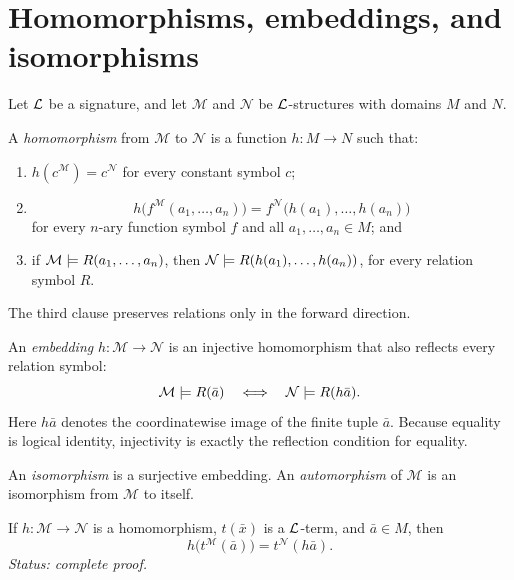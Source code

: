 \section{Homomorphisms, embeddings, and isomorphisms}
\label{sec:maps-elementarity-01}

Let \(\mathcal{L}\) be a signature, and let \(\mathcal M\) and \(\mathcal N\) be
\(\mathcal{L}\)-structures with domains \(M\) and \(N\).

\begin{definition}[Homomorphism]
A \emph{homomorphism} from \(\mathcal M\) to \(\mathcal N\) is a function
\(h:M\to N\) such that:
\begin{enumerate}
  \item \(h(c^{\mathcal M})=c^{\mathcal N}\) for every constant symbol \(c\);
  \item
  \[
    h\bigl(f^{\mathcal M}(a_1,\ldots,a_n)\bigr)
    =f^{\mathcal N}\bigl(h(a_1),\ldots,h(a_n)\bigr)
  \]
  for every \(n\)-ary function symbol \(f\) and all
  \(a_1,\ldots,a_n\in M\); and
  \item if
  \(\mathcal M\models R(a_1,\ldots,a_n)\), then
  \(\mathcal N\models R(h(a_1),\ldots,h(a_n))\), for every relation symbol
  \(R\).
\end{enumerate}
The third clause preserves relations only in the forward direction.
\end{definition}

\begin{definition}[Embedding]
An \emph{embedding} \(h:\mathcal M\to\mathcal N\) is an injective
homomorphism that also reflects every relation symbol:
\[
  \mathcal M\models R(\bar a)
  \quad\Longleftrightarrow\quad
  \mathcal N\models R(h\bar a).
\]
Here \(h\bar a\) denotes the coordinatewise image of the finite tuple
\(\bar a\).  Because equality is logical identity, injectivity is exactly the
reflection condition for equality.
\end{definition}

\begin{definition}
An \emph{isomorphism} is a surjective embedding.  An \emph{automorphism} of
\(\mathcal M\) is an isomorphism from \(\mathcal M\) to itself.
\end{definition}

\begin{lemma}
\label{lem:term-preservation}
If \(h:\mathcal M\to\mathcal N\) is a homomorphism, \(t(\bar x)\) is a
\(\mathcal{L}\)-term, and \(\bar a\in M\), then
\[
  h\bigl(t^{\mathcal M}(\bar a)\bigr)
  =t^{\mathcal N}(h\bar a).
\]
\textit{Status: complete proof.}
\end{lemma}

